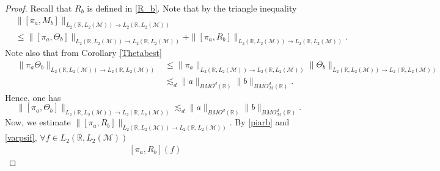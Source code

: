 \documentclass[oneside,english,a4wide]{amsart}
\numberwithin{equation}{section}
\numberwithin{figure}{section}
\theoremstyle{plain}
\theoremstyle{plain}
\theoremstyle{definition}
\theoremstyle{plain}
\theoremstyle{remark}
\theoremstyle{definition}
\theoremstyle{remark}
\theoremstyle{definition}
\newcommand{\8}{\infty}
\begin{document}
\begin{proof}	
	Recall that $R_b$ is defined in \eqref{R_b}. Note that by the triangle inequality
	\begin{equation*}
		\begin{aligned}
			{}&\|[\pi_a,M_b]\|_{L_2(\mathbb{R},L_2(\mathcal{M}))\to L_2(\mathbb{R},L_2(\mathcal{M}))}\\
			&\le \|[\pi_a,\Theta_b]\|_{L_2(\mathbb{R},L_2(\mathcal{M}))\to L_2(\mathbb{R},L_2(\mathcal{M}))}+\|[\pi_a,R_b]\|_{L_2(\mathbb{R},L_2(\mathcal{M}))\to L_2(\mathbb{R},L_2(\mathcal{M}))}.
		\end{aligned}
	\end{equation*}
	Note also that from Corollary \ref{Thetabest}
	\begin{equation}\label{a11}
		\begin{aligned}
			\quad\|\pi_{a}\Theta_{b}\|_{L_2(\mathbb{R},L_2(\mathcal{M}))\to L_2(\mathbb{R},L_2(\mathcal{M}))}
			&\le \|\pi_{a}\|_{L_2(\mathbb{R},L_2(\mathcal{M}))\to L_2(\mathbb{R},L_2(\mathcal{M}))}\|\Theta_b\|_{L_2(\mathbb{R},L_2(\mathcal{M}))\to L_2(\mathbb{R},L_2(\mathcal{M}))}\\
			&\lesssim_{d} \|a\|_{BMO^d(\mathbb{R})}\|b\|_{BMO^d_{\mathcal{M}}(\mathbb{R})}.
		\end{aligned}
	\end{equation}
	Hence, one has
	\begin{equation*}
		\|[\pi_a,\Theta_b]\|_{L_2(\mathbb{R},L_2(\mathcal{M}))\to L_2(\mathbb{R},L_2(\mathcal{M}))}\lesssim_d \|a\|_{BMO^d(\mathbb{R})}\|b\|_{BMO^d_{\mathcal{M}}(\mathbb{R})}.
	\end{equation*} 
	Now, we estimate $\|[\pi_a,R_b]\|_{L_2(\mathbb{R},L_2(\mathcal{M}))\to L_2(\mathbb{R},L_2(\mathcal{M}))}$. 
	 By \eqref{piarb} and \eqref{varpsif}, $ \forall f\in L_2(\mathbb{R},L_2(\mathcal{M}))$
	\begin{equation*}
		\begin{aligned}
			[\pi_{a}, R_b](f){}&

\end{aligned}
\end{equation*}
\end{proof}
\end{document}
